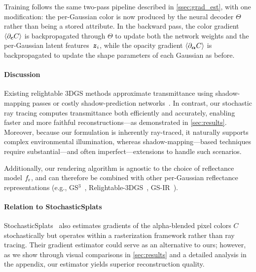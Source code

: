 Training follows the same two-pass pipeline described in \autoref{ssec:grad_est}, with one modification: the per-Gaussian color is now produced by the neural decoder $\Theta$ rather than being a stored attribute.
In the backward pass, the color gradient $\langle \partial_{\boldsymbol{c}} C \rangle$ is backpropagated through $\Theta$ to update both the network weights and the per-Gaussian latent features~$\boldsymbol{z}_i$, while the opacity gradient $\langle \partial_{\boldsymbol{\alpha}} C \rangle$ is backpropagated to update the shape parameters of each Gaussian as before.

\paragraph{Discussion}
Existing relightable 3DGS methods approximate transmittance using shadow-mapping passes or costly shadow-prediction networks~\cite{RNG, bi2024rgs}.
In contrast, our stochastic ray tracing computes transmittance both efficiently and accurately, enabling faster and more faithful reconstructions---as demonstrated in \autoref{sec:results}.
Moreover, because our formulation is inherently ray-traced, it naturally supports complex environmental illumination, whereas shadow-mapping---based techniques require substantial---and often imperfect---extensions to handle such scenarios.

Additionally, our rendering algorithm is agnostic to the choice of reflectance model $f_\mathrm{r}$, and can therefore be combined with other per-Gaussian reflectance representations (e.g., GS$^3$~\cite{bi2024rgs}, Relightable-3DGS~\cite{R3DG2023}, GS-IR~\cite{liang2023gs}).%

\paragraph{Relation to StochasticSplats}
	StochasticSplats~\cite{kv2025stochasticsplats} also estimates gradients of the alpha-blended pixel colors $C$ stochastically but operates within a rasterization framework rather than ray tracing.
	Their gradient estimator could serve as an alternative to ours; however, as we show through visual comparisons in \autoref{sec:results} and a detailed analysis in the appendix, our estimator yields superior reconstruction quality.
